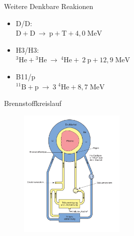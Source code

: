 \documentclass[aspectratio=169,xcolor=dvipsnames,14pt]{beamer}
\begin{document}
    \begin{frame}{Weitere Denkbare Reakionen}
        \begin{itemize}
            \color{LightGrey}
            \item D/D: \\
                    \begin{math}
                        {\displaystyle \mathrm {D} +\mathrm {D} \ \to \ \mathrm {p} +\mathrm {T} +4{,}0\;\mathrm {MeV} }
                    \end{math}
    
            \item H3/H3: \\
            \begin{math}
                {\displaystyle \mathrm {^{3}He+\!^{3}He\ \rightarrow \ ^{4}He+\ 2\ p+12{,}9\;MeV} }
            \end{math}

            \item B11/p \\
            \begin{math}
                {\displaystyle \mathrm {^{11}B+\!p\ \rightarrow \ 3\;^{4}He+8{,}7\;MeV} }
            \end{math}
            
        \end{itemize}
    \end{frame}

    \begin{frame}{Brennstoffkreislauf}
        \begin{figure}
            \centering
            \includegraphics[width=0.45\textwidth]{Images/Fusionskreislauf.png}
        \end{figure}    
    \end{frame}
\end{document}
